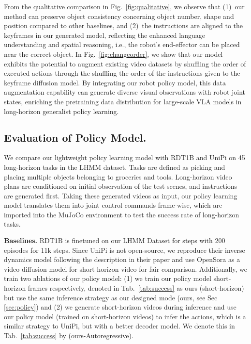 \documentclass[letterpaper, 10 pt, conference]{ieeeconf}  %
\begin{document}
From the qualitative comparison in Fig.~\ref{fig:qualitative}, we observe that (1)~our method can preserve object consistency concerning object number, shape and position compared to other baselines, and (2)~the instructions are aligned to the keyframes in our generated model, reflecting the enhanced language understanding and spatial reasoning, i.e., the robot's end-effector can be placed near the correct object. In Fig.~\ref{fig:changeorder}, we show that our model exhibits the potential to augment existing video datasets by shuffling the order of executed actions through the shuffling the order of the instructions given to the keyframe diffusion model. By integrating our robot policy model, this data augmentation capability can generate diverse visual observations with robot joint states, enriching the pretraining data distribution for large-scale VLA models in long-horizon generalist policy learning.







\subsection{Evaluation of Policy Model.}
\label{sec:poseEx}
We compare our lightweight policy learning model with RDT1B\cite{rdtb} and UniPi\cite{unipi} on 45 long-horizon tasks in the LHMM dataset. Tasks are defined as picking and placing multiple objects belonging to groceries and tools. Long-horizon video plans are conditioned on initial observation of the test scenes, and instructions are generated first. Taking these generated videos as input, our policy learning model translates them into joint control commands frame-wise, which are imported into the MuJoCo environment to test the success rate of long-horizon tasks.
 
\noindent\textbf{Baselines.} RDT1B \cite{rdtb} is finetuned on our LHMM Dataset for steps with 200 episodes for 11k steps. Since UniPi is not open-source, we reproduce their inverse dynamics model following the description in their paper and use OpenSora as a video diffusion model for short-horizon video for fair comparison. 
Additionally, we train two ablations of our policy model: (1) we train our policy model short-horizon frames respectively, denoted in Tab.~\ref{tab:success} as ours (short-horizon) but use the same inference strategy as our designed mode (ours, see Sec \ref{sec:policy}) and (2) we generate short-horizon videos during inference and use our policy model (trained on short-horizon videos) to infer the actions, which is a similar strategy to UniPi, but with a better decoder model. We denote this in Tab.~\ref{tab:success} by (ours-Autoregressive).
\end{document}
